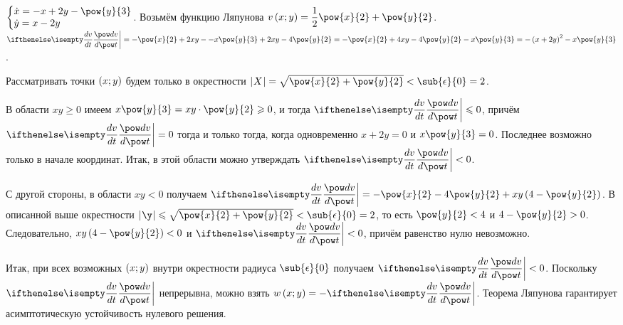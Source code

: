 \documentclass[a5paper,10pt]{article}
\begin{document}
$\tsys{\dot{x} = -x + 2y - \pow{y}{3} \\ \dot{y} = x - 2y}$.
Возьмём функцию Ляпунова 
$v\br{x; y} = \dfrac {1} {2} \pow{x}{2} + \pow{y}{2}$.
$\der{v}{t} \bigg| 
    = -\pow{x}{2} + 2xy - \linebreak - x\pow{y}{3} + 2xy - 4\pow{y}{2} 
    = -\pow{x}{2} + 4xy - 4\pow{y}{2} - x\pow{y}{3} = -\br{x + 2y}^2 - x\pow{y}{3}$.

Рассматривать точки $\left(\hspace{0.01em}x; y\hspace{0.01em}\right)$ будем только в окрестности 
$\vbr{X} = \sqrt{\pow{x}{2} + \pow{y}{2}} < \sub{\epsilon}{0} = 2$.

В области $xy \ge 0$ имеем 
$x\pow{y}{3} = xy \cdot \pow{y}{2} \ge 0$,
и тогда $\der{v}{t} \bigg| \le 0$, причём $\der{v}{t} \bigg| = 0$
тогда и только тогда, когда одновременно $x + 2y = 0$ и $x\pow{y}{3} = 0$.
Последнее возможно только в начале координат. 
Итак, в этой области можно утверждать $\der{v}{t} \bigg| < 0$.

С другой стороны, в области $xy < 0$ получаем 
$\der{v}{t} \bigg| = -\pow{x}{2} - 4\pow{y}{2} + xy \br{4 - \pow{y}{2}}$.
В описанной выше окрестности 
$\vbr{\y} \le \sqrt{\pow{x}{2} + \pow{y}{2}} < \sub{\epsilon}{0} = 2$,
то есть $\pow{y}{2} < 4$ и $4 - \pow{y}{2} > 0$.
Следовательно, 
$xy \br{4 - \pow{y}{2}} < 0$ и $\der{v}{t} \bigg| < 0$,
причём равенство нулю невозможно.

Итак, при всех возможных $\left(\hspace{0.01em}x; y\hspace{0.01em}\right)$ внутри окрестности радиуса 
$\sub{\epsilon}{0}$ получаем $\der{v}{t} \bigg| < 0$.
Поскольку $\der{v}{t} \bigg|$ непрерывна, можно взять 
$w\br{x; y} = -\der{v}{t} \bigg|$. 
Теорема Ляпунова гарантирует асимптотическую устойчивость нулевого решения.
\end{document}
